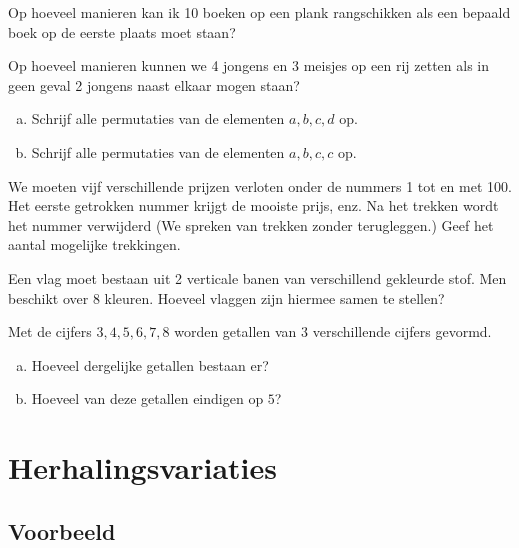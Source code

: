 \documentclass[12pt,a4,twoside]{article}
\begin{document}
\begin{oefening}
Op hoeveel manieren kan ik 10 boeken op een plank rangschikken als een bepaald boek op de eerste plaats moet staan?
\end{oefening}

\begin{oefening}
Op hoeveel manieren kunnen we 4 jongens en 3 meisjes op een rij zetten als in geen geval 2 jongens naast elkaar mogen staan?
\end{oefening}

\begin{oefening}
\begin{enumerate}[(a)]
  \item Schrijf alle permutaties van de elementen $a,b,c,d$ op.
  \item Schrijf alle permutaties van de elementen $a,b,c,c$ op.
\end{enumerate}
\end{oefening}

\begin{oefening}
We moeten vijf verschillende prijzen verloten onder de nummers 1 tot en met 100.
Het eerste getrokken nummer krijgt de mooiste prijs, enz. Na het trekken wordt het
nummer verwijderd (We spreken van trekken zonder terugleggen.)
Geef het aantal mogelijke trekkingen.
\end{oefening}

\begin{oefening}
Een vlag moet bestaan uit 2 verticale banen van verschillend gekleurde stof.
Men beschikt over 8 kleuren. Hoeveel vlaggen zijn hiermee samen te stellen?
\end{oefening}

\begin{oefening}
Met de cijfers $3, 4, 5, 6, 7, 8$ worden getallen van $3$ verschillende cijfers gevormd.
\begin{enumerate}[(a)]
  \item Hoeveel dergelijke getallen bestaan er?
  \item Hoeveel van deze getallen eindigen op $5$?
\end{enumerate}
\end{oefening}

\pagebreak
\section{Herhalingsvariaties}

\subsection{Voorbeeld}
\end{document}
